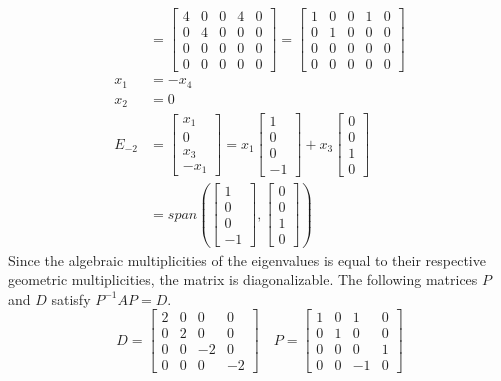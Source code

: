 \documentclass{math}
\begin{document}
\begin{align*}
  [A+2I|0] &= \begin{bmatrix}
    4 & 0 & 0 & 4 & 0 \\
    0 & 4 & 0 & 0 & 0 \\
    0 & 0 & 0 & 0 & 0 \\
    0 & 0 & 0 & 0 & 0
  \end{bmatrix} = \begin{bmatrix}
    1 & 0 & 0 & 1 & 0 \\
    0 & 1 & 0 & 0 & 0 \\
    0 & 0 & 0 & 0 & 0 \\
    0 & 0 & 0 & 0 & 0
  \end{bmatrix} \\
  x_1 &= -x_4 \\
  x_2 &= 0 \\
  E_{-2} &= \begin{bmatrix}x_1 \\ 0 \\ x_3 \\ -x_1\end{bmatrix} =
    x_1\begin{bmatrix}1 \\ 0 \\ 0 \\ -1\end{bmatrix}+
    x_3\begin{bmatrix}0 \\ 0 \\ 1 \\ 0\end{bmatrix} \\
  &= span\left(\begin{bmatrix}1 \\ 0 \\ 0 \\ -1\end{bmatrix},
    \begin{bmatrix}0 \\ 0 \\ 1 \\ 0\end{bmatrix}\right)
\end{align*}
Since the algebraic multiplicities of the eigenvalues is equal to their
respective geometric multiplicities, the matrix is diagonalizable. The
following matrices \( P \) and \( D \) satisfy \( P^{-1}AP = D \).
\[ D = \begin{bmatrix}
    2 & 0 & 0 & 0 \\
    0 & 2 & 0 & 0 \\
    0 & 0 & -2 & 0 \\
    0 & 0 & 0 & -2
  \end{bmatrix} \quad P = \begin{bmatrix}
    1 & 0 & 1 & 0 \\
    0 & 1 & 0 & 0 \\
    0 & 0 & 0 & 1 \\
    0 & 0 & -1 & 0
  \end{bmatrix} \]
\end{document}
